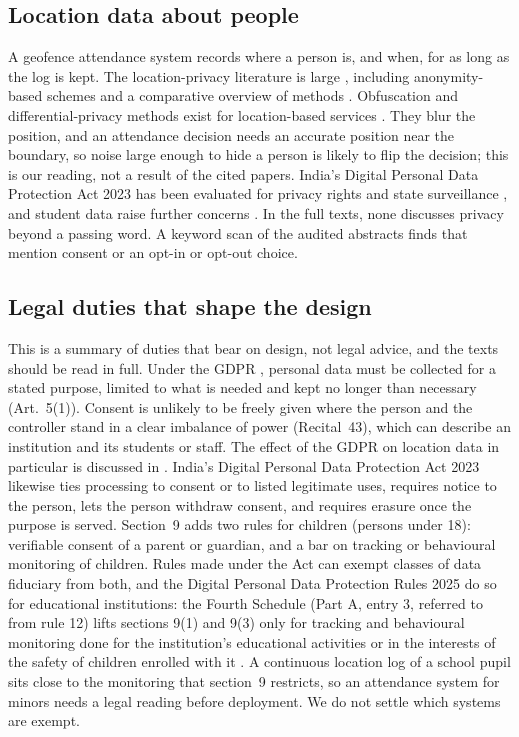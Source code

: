 \documentclass[preprint,12pt]{elsarticle}
\begin{document}
\subsection{Location data about people}
A geofence attendance system records where a person is, and when, for as long as the log is kept. The location-privacy literature is large \cite{@75,krumm2009privacy,beresford2003location}, including anonymity-based schemes \cite{@43} and a comparative overview of methods \cite{@312}. Obfuscation and differential-privacy methods exist for location-based services \cite{@2061,@2093}. They blur the position, and an attendance decision needs an accurate position near the boundary, so noise large enough to hide a person is likely to flip the decision; this is our reading, not a result of the cited papers. India's Digital Personal Data Protection Act 2023 \cite{dpdp2023} has been evaluated for privacy rights and state surveillance \cite{@1641}, and student data raise further concerns \cite{@8,@645}. In the \ftN{} full texts, none discusses privacy beyond a passing word. A keyword scan of the \hfN{} audited abstracts finds \hfConsent{} that mention consent or an opt-in or opt-out choice.

\subsection{Legal duties that shape the design}
This is a summary of duties that bear on design, not legal advice, and the texts should be read in full. Under the GDPR \cite{gdpr2016}, personal data must be collected for a stated purpose, limited to what is needed and kept no longer than necessary (Art.~5(1)). Consent is unlikely to be freely given where the person and the controller stand in a clear imbalance of power (Recital~43), which can describe an institution and its students or staff. The effect of the GDPR on location data in particular is discussed in \cite{@278}. India's Digital Personal Data Protection Act 2023 \cite{dpdp2023} likewise ties processing to consent or to listed legitimate uses, requires notice to the person, lets the person withdraw consent, and requires erasure once the purpose is served. Section~9 adds two rules for children (persons under 18): verifiable consent of a parent or guardian, and a bar on tracking or behavioural monitoring of children. Rules made under the Act can exempt classes of data fiduciary from both, and the Digital Personal Data Protection Rules 2025 do so for educational institutions: the Fourth Schedule (Part A, entry 3, referred to from rule 12) lifts sections 9(1) and 9(3) only for tracking and behavioural monitoring done for the institution's educational activities or in the interests of the safety of children enrolled with it \cite{dpdp2025rules}. A continuous location log of a school pupil sits close to the monitoring that section~9 restricts, so an attendance system for minors needs a legal reading before deployment. We do not settle which systems are exempt.
\end{document}
